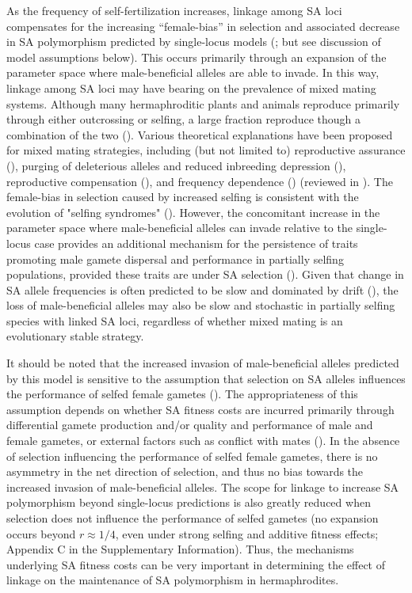 \documentclass{article}
\begin{document}
As the frequency of self-fertilization increases, linkage among SA loci compensates for the increasing ``female-bias'' in selection and associated decrease in SA polymorphism predicted by single-locus models (\citealt{Charlesworth1978, JordanConn2014}; but see discussion of model assumptions below). This occurs primarily through an expansion of the parameter space where male-beneficial alleles are able to invade. In this way, linkage among SA loci may have bearing on the prevalence of mixed mating systems. Although many hermaphroditic plants and animals reproduce primarily through either outcrossing or selfing, a large fraction reproduce though a combination of the two (\citealt{JarneAuld2006, Goodwillie2005, Igic2005}). Various theoretical explanations have been proposed for mixed mating strategies, including (but not limited to) reproductive assurance (\citealt{Lloyd1979}), purging of deleterious alleles and reduced inbreeding depression (\citealt{LandeSchemske1985}), reproductive compensation (\citealt{HarderRoutley2007, PorcherLande2005}), and frequency dependence (\citealt{Holsinger1991}) (reviewed in \citealt{Goodwillie2005, HarderBarrett2006}). {\color{blue} The female-bias in selection caused by increased selfing is consistent with the evolution of "selfing syndromes" (\citealt{Sicard2011,JordanConn2014}). However, the concomitant increase in the parameter space where male-beneficial alleles can invade relative to the single-locus case provides an additional mechanism for the persistence of traits promoting male gamete dispersal and performance in partially selfing populations, provided these traits are under SA selection (\citealt{Barrett2002, Goodwillie2005, HarderBarrett2006})}. Given that change in SA allele frequencies is often predicted to be slow and dominated by drift (\citealt{ConnClark2011, ConnClark2012, ConnClark2014}), the loss of male-beneficial alleles may also be slow and stochastic in partially selfing species with linked SA loci, regardless of whether mixed mating is an evolutionary stable strategy.

It should be noted that the increased invasion of male-beneficial alleles predicted by this model is sensitive to the assumption that selection on SA alleles influences the performance of selfed female gametes (\citealt{Tazzyman2015}). The appropriateness of this assumption depends on whether SA fitness costs are incurred primarily through differential gamete production and/or quality and performance of male and female gametes, or external factors such as conflict with mates (\citealt{Tazzyman2015}). In the absence of selection influencing the performance of selfed female gametes, there is no asymmetry in the net direction of selection, and thus no bias towards the increased invasion of male-beneficial alleles. The scope for linkage to increase SA polymorphism beyond single-locus predictions is also greatly reduced when selection does not influence the performance of selfed gametes (no expansion occurs beyond $r \approx 1/4$, even under strong selfing and additive fitness effects; Appendix C in the Supplementary Information). Thus, the mechanisms underlying SA fitness costs can be very important in determining the effect of linkage on the maintenance of SA polymorphism in hermaphrodites.
\end{document}
